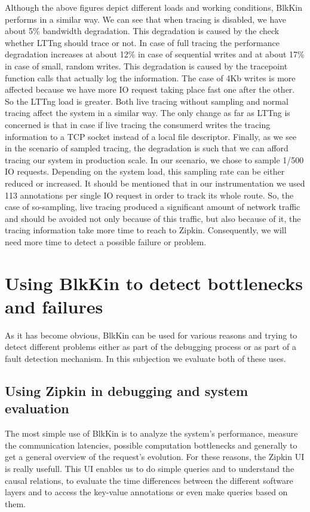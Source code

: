 Although the above figures depict different loads and working conditions, BlkKin
performs in a similar way. We can see that when tracing is disabled, we have
about 5\% bandwidth degradation. This degradation is caused by the check whether
LTTng should trace or not. In case of full tracing the performance degradation
increases at about 12\% in case of sequential writes and at about 17\% in case
of small, random writes. This degradation is caused by the tracepoint function
calls that actually log the information. The case of 4Kb writes is more affected
because we have more IO request taking place fast one after the other. So the
LTTng load is greater. Both live tracing without sampling and normal tracing
affect the system in a similar way. The only change as far as LTTng is concerned
is that in case if live tracing the consumerd writes the tracing information to
a TCP socket instead of a local file descriptor. Finally, as we see in the
scenario of sampled tracing, the degradation is such that we can afford tracing
our system in production scale. In our scenario, we chose to sample 1/500 IO
requests. Depending on the system load, this sampling rate can be either reduced
or increased. It should be mentioned that in our instrumentation we used 113
annotations per single IO request in order to track its whole route. So, the
case of so-sampling, live tracing produced a significant amount of network
traffic and should be avoided not only because of this traffic, but also because
of it, the tracing information take more time to reach to Zipkin. Consequently,
we will need more time to detect a possible failure or problem.

\section{Using BlkKin to detect bottlenecks and failures}\label{sec:failures}

As it has become obvious, BlkKin can be used for various reasons and trying to
detect different problems either as part of the debugging process or as part of
a fault detection mechanism. In this subjection we evaluate both of these uses.

\subsection{Using Zipkin in debugging and system evaluation}
The most simple use of BlkKin is to analyze the system's performance, measure
the communication latencies, possible computation bottlenecks and generally to
get a general overview of the request's evolution.  For these reasons, the
Zipkin UI is really usefull. This UI enables us to do simple queries and to
understand the causal relations, to evaluate the time differences between the
different software layers and to access the key-value annotations or even make
queries based on them.


